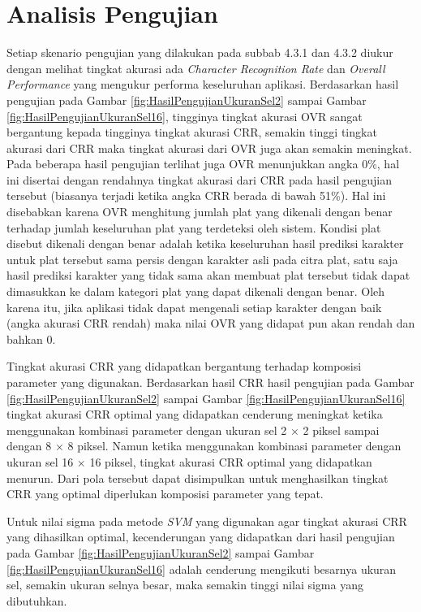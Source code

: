\section{Analisis Pengujian}
\noindent Setiap skenario pengujian yang dilakukan pada subbab 4.3.1 dan 4.3.2 diukur dengan melihat tingkat akurasi ada \textit{Character Recognition Rate} dan \textit{Overall Performance} yang mengukur performa keseluruhan aplikasi. Berdasarkan hasil pengujian pada Gambar \ref{fig:HasilPengujianUkuranSel2} sampai Gambar \ref{fig:HasilPengujianUkuranSel16}, tingginya tingkat akurasi OVR sangat bergantung kepada tingginya tingkat akurasi CRR, semakin tinggi tingkat akurasi dari CRR maka tingkat akurasi dari OVR juga akan semakin meningkat. Pada beberapa hasil pengujian terlihat juga OVR menunjukkan angka 0\%, hal ini disertai dengan rendahnya tingkat akurasi dari CRR pada hasil pengujian tersebut (biasanya terjadi ketika angka CRR berada di bawah 51\%). Hal ini disebabkan karena OVR menghitung jumlah plat yang dikenali dengan benar terhadap jumlah keseluruhan plat yang terdeteksi oleh sistem. Kondisi plat disebut dikenali dengan benar adalah ketika keseluruhan hasil prediksi karakter untuk plat tersebut sama persis dengan karakter asli pada citra plat, satu saja hasil prediksi karakter yang tidak sama akan membuat plat tersebut tidak dapat dimasukkan ke dalam kategori plat yang dapat dikenali dengan benar. Oleh karena itu, jika aplikasi tidak dapat mengenali setiap karakter dengan baik (angka akurasi CRR rendah) maka nilai OVR yang didapat pun akan rendah dan bahkan 0.

\noindent Tingkat akurasi CRR yang didapatkan bergantung terhadap komposisi parameter yang digunakan. Berdasarkan hasil CRR hasil pengujian pada Gambar \ref{fig:HasilPengujianUkuranSel2} sampai Gambar \ref{fig:HasilPengujianUkuranSel16} tingkat akurasi CRR optimal yang didapatkan cenderung meningkat ketika menggunakan kombinasi parameter dengan ukuran sel 2 $\times$ 2 piksel sampai dengan 8 $\times$ 8 piksel. Namun ketika menggunakan kombinasi parameter dengan ukuran sel 16 $\times$ 16 piksel, tingkat akurasi CRR optimal yang didapatkan menurun. Dari pola tersebut dapat disimpulkan untuk menghasilkan tingkat CRR yang optimal diperlukan komposisi parameter yang tepat.

\noindent Untuk nilai sigma pada metode \textit{SVM} yang digunakan agar tingkat akurasi CRR yang dihasilkan optimal, kecenderungan yang didapatkan dari hasil pengujian pada Gambar \ref{fig:HasilPengujianUkuranSel2} sampai Gambar \ref{fig:HasilPengujianUkuranSel16} adalah cenderung mengikuti besarnya ukuran sel, semakin ukuran selnya besar, maka semakin tinggi nilai sigma yang dibutuhkan.

